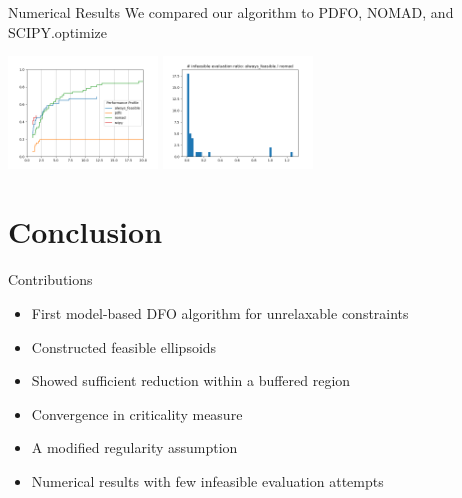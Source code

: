\documentclass{beamer}
\begin{document}
\begin{frame}{Numerical Results}
	We compared our algorithm to PDFO, NOMAD, and SCIPY.optimize
	\begin{center}
		\includegraphics[width=150px]{images/nonlinear_performance_profile.png}
		\includegraphics[width=150px]{images/infeasible_evaluation_ratio.png}
	\end{center}
\end{frame}




\section{Conclusion}

\begin{frame}{Contributions}
	\begin{itemize}
		\setlength\itemsep{1.5em}
		\item First model-based DFO algorithm for unrelaxable constraints
		\item Constructed feasible ellipsoids
		\item Showed sufficient reduction within a buffered region
		\item Convergence in criticality measure
		\item A modified regularity assumption
		\item Numerical results with few infeasible evaluation attempts
	\end{itemize}
\end{frame}
\end{document}
